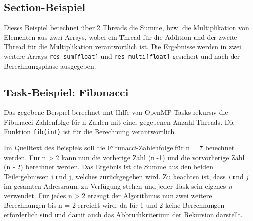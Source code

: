 \documentclass[11pt]{scrartcl}
\begin{document}
\subsection{Section-Beispiel }

Dieses Beispiel berechnet über 2 Threads die Summe, bzw. die Multiplikation von Elementen aus zwei Arrays, wobei ein Thread für die Addition und der zweite Thread für die Multiplikation verantwortlich ist. Die Ergebnisse werden in zwei weitere Arrays \texttt{res\_sum[float]} und \texttt{res\_multi[float]} gesichert und nach der Berechnungsphase ausgegeben. 

\subsection{Task-Beispiel: Fibonacci}

Das gegebene Beispiel berechnet mit Hilfe von OpenMP-Tasks rekursiv die Fibunacci-Zahlenfolge für n-Zahlen mit einer gegebenen Anzahl Threads. Die Funktion \texttt{fib(int)} ist für die Berechnung verantwortlich.

Im Quelltext des Beispiels soll die Fibunacci-Zahlenfolge für n = 7 berechnet werden. Für n > 2 kann nun die vorherige Zahl (n -1) und die vorvorherige Zahl (n - 2) berechnet werden. Das Ergebnis ist die Summe aus den beiden Teilergebnissen i und j, welches zurückgegeben wird. Zu beachten ist, dass \textit{i} und \textit{j} im gesamten Adressraum zu Verfügung stehen und jeder Task sein eigenes \textit{n} verwendet. Für jedes n > 2 erzeugt der Algorithmus nun zwei weitere Berechnungen bis n = 2 erreicht wird, da für 1 und 2 keine Berechnungen erforderlich sind und damit auch das Abbruchkriterium der Rekursion darstellt.  
\end{document}
